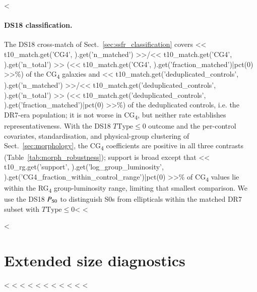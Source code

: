 \documentclass{aa}
\newcommand{\CG}{CG\textsubscript{4}}
\newcommand{\RG}{RG\textsubscript{4}}
\begin{document}
\begin{appendix}
<%
\paragraph{DS18 classification.} The DS18 cross-match of Sect.~\ref{sec:ssfr_classification} covers << t10_match.get('CG4', {}).get('n_matched') >>/<< t10_match.get('CG4', {}).get('n_total') >> (<< t10_match.get('CG4', {}).get('fraction_matched')|pct(0) >>\%) of the \CG{} galaxies and << t10_match.get('deduplicated_controls', {}).get('n_matched') >>/<< t10_match.get('deduplicated_controls', {}).get('n_total') >> (<< t10_match.get('deduplicated_controls', {}).get('fraction_matched')|pct(0) >>\%) of the deduplicated controls, i.e. the DR7-era population; it is not worse in \CG{}, but neither rate establishes representativeness. With the DS18 \(T\mathrm{Type}\leq0\) outcome and the per-control covariates, standardisation, and physical-group clustering of Sect.~\ref{sec:morphology}, the \CG{} coefficients are positive in all three contrasts (Table~\ref{tab:morph_robustness}); support is broad except that << t10_rg.get('support', {}).get('log_group_luminosity', {}).get('CG4_fraction_within_control_range')|pct(0) >>\% of \CG{} values lie within the \RG{} group-luminosity range, limiting that smallest comparison. We use the DS18 \(P_{\rm S0}\) to distinguish S0s from ellipticals within the matched DR7 subset with \(T\mathrm{Type}\leq0\)<%
<%

\FloatBarrier
\endgroup

<%
\section{Extended size diagnostics}\label{app:size_details}
<%
<%
<%
<%
<%
<%
<%
<%
<%
<%
<%


\end{appendix}
\end{document}
